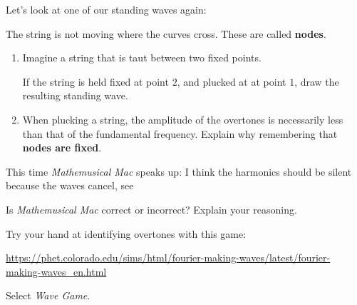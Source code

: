 \documentclass[12pt,noauthor,nooutcomes,]{ximera}
\begin{document}
\begin{question} %
Let's look at one of our standing waves again:
\begin{center}
\end{center}
The string is not moving where the curves cross. These are called \textbf{nodes}. 
\begin{enumerate}
\item Imagine a string that is taut between two fixed points. 
\begin{center}
\end{center}
If the string is held fixed at point $2$, and plucked at at point $1$, draw the resulting standing wave.
\item  When plucking a string, the amplitude of the overtones is necessarily less than that of the fundamental frequency. Explain why remembering that \textbf{nodes are fixed}.
\end{enumerate}


\end{question}




\begin{question} 
This time \textit{Mathemusical Mac} speaks up: I think the harmonics should be silent because the waves cancel, see
\begin{center}
\end{center}
Is \textit{Mathemusical Mac} correct or incorrect? Explain your reasoning.
\end{question}


\begin{question}
Try your hand at identifying overtones with this game:

\begin{center}
    \url{https://phet.colorado.edu/sims/html/fourier-making-waves/latest/fourier-making-waves_en.html}
\end{center}
Select \textit{Wave Game}.
\end{question}
\end{document}

